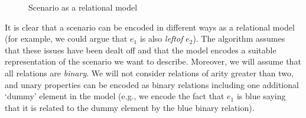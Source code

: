 \begin{figure}[ht]
\begin{minipage}[b]{0.6\linewidth}
\caption{Scenario as a relational model}
\label{GRE3D7-stimulus-graph}
\end{minipage}
\end{figure}

It is clear that a scenario can be encoded in different ways as a relational model (for example, we could argue that $e_1$ is also \emph{leftof} $e_2$).  The algorithm assumes that these issues have been dealt off and that the model encodes a suitable representation of the scenario we want to describe.  Moreover, we will assume that all relations are \emph{binary}.  We will not consider relations of arity greater than two, and unary
properties can be encoded as binary relations including one additional `dummy' element in the model (e.g., we encode the fact that $e_1$ is blue saying that it is related to the dummy element by the blue binary relation).


